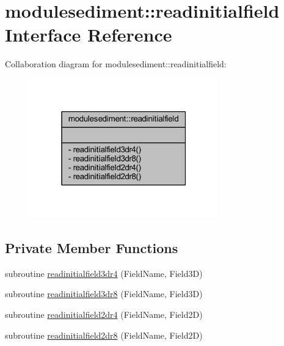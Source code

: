 \hypertarget{interfacemodulesediment_1_1readinitialfield}{}\section{modulesediment\+:\+:readinitialfield Interface Reference}
\label{interfacemodulesediment_1_1readinitialfield}


Collaboration diagram for modulesediment\+:\+:readinitialfield\+:\nopagebreak
\begin{figure}[H]
\begin{center}
\leavevmode
\includegraphics[width=232pt]{interfacemodulesediment_1_1readinitialfield__coll__graph}
\end{center}
\end{figure}
\subsection*{Private Member Functions}
\begin{DoxyCompactItemize}
\item 
subroutine \mbox{\hyperlink{interfacemodulesediment_1_1readinitialfield_a6f91524e49568ad8f52b1e44c49c7848}{readinitialfield3dr4}} (Field\+Name, Field3D)
\item 
subroutine \mbox{\hyperlink{interfacemodulesediment_1_1readinitialfield_a05639a978fc8ba37275a4a14297f9e89}{readinitialfield3dr8}} (Field\+Name, Field3D)
\item 
subroutine \mbox{\hyperlink{interfacemodulesediment_1_1readinitialfield_a60740041aa04aed49a6a61cdcbe52848}{readinitialfield2dr4}} (Field\+Name, Field2D)
\item 
subroutine \mbox{\hyperlink{interfacemodulesediment_1_1readinitialfield_ae212d0eef3a37f7d34ae1d00a7c4722d}{readinitialfield2dr8}} (Field\+Name, Field2D)
\end{DoxyCompactItemize}


